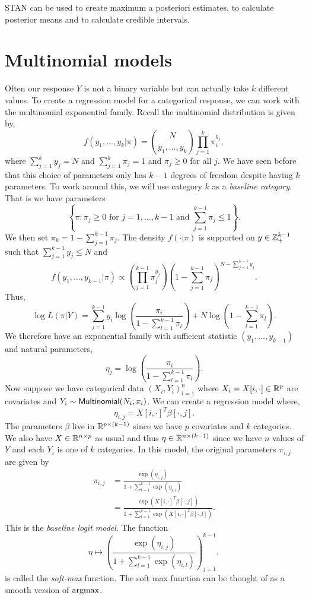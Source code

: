 STAN can be used to create maximum a posteriori estimates, to calculate posterior means and to calculate credible intervals.

\section{Multinomial models}
Often our response $Y$ is not a binary variable but can actually take $k$ different values. To create a regression model for a categorical response, we can work with the multinomial exponential family. Recall the multinomial distribution is given by,
\[f(y_1,\ldots,y_k|\pi) = \binom{N}{y_1,\ldots,y_k} \prod_{j=1}^k \pi_i^{y_j}, \]
where $\sum_{j=1}^k y_j = N$ and $\sum_{j=1}^k \pi_j =1$ and $\pi_j \ge 0$ for all $j$. We have seen before that this choice of parameters only has $k-1$ degrees of freedom despite having $k$ parameters. To work around this, we will use category $k$ as a \emph{baseline category}. That is we have parameters 
\[\left\{\pi: \pi_j \ge 0 \text{ for } j=1,\ldots,k-1 \text{ and } \sum_{j=1}^{k-1}\pi_j \le 1 \right\}.\] 
We then set $\pi_k = 1-\sum_{j=1}^{k-1}\pi_j$. The density $f(\cdot|\pi)$ is supported on $y \in {{\mathbb Z}}_+^{k-1}$ such that $\sum_{j=1}^{k-1} y_j \le N$ and
\[f(y_1,\ldots, y_{k-1}|\pi) \propto \left(\prod_{j=1}^{k-1} \pi_j^{y_j}\right)\left(1-\sum_{j=1}^{k-1}\pi_j\right)^{N - \sum_{j=1}^{k-1}y_j}. \]
Thus,
\[\log L(\pi|Y) = \sum_{j=1}^{k-1} y_i \log\left(\frac{\pi_i}{1-\sum_{l=1}^{k-1}\pi_l}\right) +N\log\left(1-\sum_{l=1}^{k-1}\pi_l\right).\]
We therefore have an exponential family with sufficient statistic $(y_1,\ldots, y_{k-1})$ and natural parameters,
\[\eta_j = \log\left(\frac{\pi_i}{1-\sum_{l=1}^{k-1}\pi_l}\right). \]
Now suppose we have categorical data $(X_i,Y_i)_{i=1}^n$  where $X_i = X[i,\cdot]\in{\mathbb R}^p$ are covariates and $Y_i \sim \mathsf{Multinomial}(N_i,\pi_i)$. We can create a regression model where,
\[\eta_{i,j} = X[i,\cdot]^T \beta[\cdot,j]. \]
The parameters $\beta$ live in ${\mathbb R}^{p \times (k-1)}$  since we have $p$ covariates and $k$ categories. We also have $X \in {\mathbb R}^{n \times p}$ as usual and thus $\eta \in {\mathbb R}^{n \times (k-1)}$ since we have $n$ values of $Y$ and each $Y_i$ is one of $k$ categories. In this model, the original parameters $\pi_{i,j}$ are given by
\begin{align*}
    \pi_{i,j} &= \frac{\exp(\eta_{i,j})}{1+\sum_{l=1}^{k-1}\exp(\eta_{i,l})}\\
    &=\frac{\exp(X[i,\cdot]^T \beta[\cdot,j])}{1+\sum_{l=1}^{k-1}\exp(X[i,\cdot]^T \beta[\cdot,l])}.
\end{align*}
This is the \emph{baseline logit model}. The function
\[ \eta \mapsto \left(\frac{\exp(\eta_{i,j})}{1+\sum_{l=1}^{k-1}\exp(\eta_{i,l})}\right)_{j=1}^{k-1},\]
is called the \emph{soft-max} function. The soft max function can be thought of as a smooth version of $\operatorname*{argmax}$.
